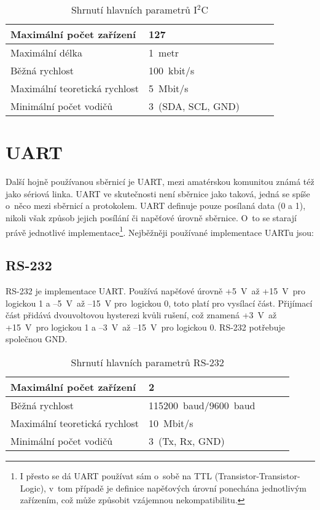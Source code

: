 \begin{table}[h]
	
	\centering
	\begin{tabular}{|l|l|l|l|l|} \hline
		Maximální počet zařízení      & 127              \\ \hline
		Maximální délka               & 1~metr           \\ \hline
		Běžná rychlost                & 100~kbit/s        \\ \hline
		Maximální teoretická rychlost & 5~Mbit/s          \\ \hline
		Minimální počet vodičů        & 3~(SDA, SCL, GND) \\ \hline
	\end{tabular}
	\caption{Shrnutí hlavních parametrů I$^{2}$C}
\end{table}



\section{UART}
Další hojně používanou sběrnicí je UART, mezi amatérskou komunitou známá též jako sériová linka.
UART ve skutečnosti není sběrnice jako taková, jedná se spíše o~něco mezi sběrnicí a protokolem.
UART definuje pouze posílaná data (0 a 1), nikoli však způsob jejich posílání či napěťové úrovně sběrnice.
O~to se starají právě jednotlivé implementace\footnote{I přesto se dá UART používat sám o~sobě na TTL (Transistor-Transistor-Logic), v~tom případě je definice napěťových úrovní ponechána jednotlivým zařízením, což může způsobit vzájemnou nekompatibilitu.}.
Nejběžněji používané implementace UARTu jsou:
\subsection{RS-232} %
RS-232 \cite{RS-232} je implementace UART.
Používá napěťové úrovně +5~V~až +15~V~pro logickou 1 a --5~V~až --15~V   pro~logickou 0, toto platí pro vysílací část.
Přijímací část přidává dvouvoltovou hysterezi kvůli rušení, což znamená +3~V~až +15~V~pro logickou 1 a --3~V~až --15~V~pro logickou 0.
RS-232 potřebuje společnou GND.
\begin{table}[h]
	
	\centering
	\begin{tabular}{|l|l|l|l|l|} \hline
		Maximální počet zařízení      & 2              \\ \hline
		Běžná rychlost                & 115200~baud/9600~baud        \\ \hline
		Maximální teoretická rychlost & 10~Mbit/s       \\ \hline
		Minimální počet vodičů        & 3~(Tx, Rx, GND) \\ \hline
	\end{tabular}
	\caption{Shrnutí hlavních parametrů RS-232}
\end{table}
